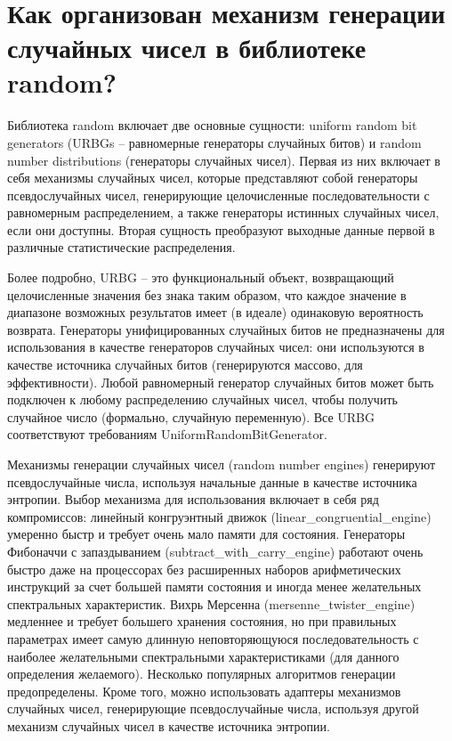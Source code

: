 \documentclass[a4paper,12pt]{article}	%
\title{
	\center{\textbf{Контрольные вопросы. Задание 16.}}
	}
\begin{document}

\maketitle

\section{Как организован механизм генерации случайных чисел в библиотеке random?}

	Библиотека random включает две основные сущности: uniform random bit generators (URBGs -- равномерные генераторы случайных битов) и random number distributions (генераторы случайных чисел). Первая из них включает в себя механизмы случайных чисел, которые представляют собой генераторы псевдослучайных чисел, генерирующие целочисленные последовательности с равномерным распределением, а также генераторы истинных случайных чисел, если они доступны. Вторая сущность преобразуют выходные данные первой в различные статистические распределения.
	
	Более подробно, URBG -- это функциональный объект, возвращающий целочисленные значения без знака таким образом, что каждое значение в диапазоне возможных результатов имеет (в идеале) одинаковую вероятность возврата. Генераторы унифицированных случайных битов не предназначены для использования в качестве генераторов случайных чисел: они используются в качестве источника случайных битов (генерируются массово, для эффективности). Любой равномерный генератор случайных битов может быть подключен к любому распределению случайных чисел, чтобы получить случайное число (формально, случайную переменную). Все URBG соответствуют требованиям UniformRandomBitGenerator.
	
	Механизмы генерации случайных чисел (random number engines) генерируют псевдослучайные числа, используя начальные данные в качестве источника энтропии. Выбор механизма для использования включает в себя ряд компромиссов: линейный конгруэнтный движок (linear\_congruential\_engine) умеренно быстр и требует очень мало памяти для состояния. Генераторы Фибоначчи с запаздыванием (subtract\_with\_carry\_engine) работают очень быстро даже на процессорах без расширенных наборов арифметических инструкций за счет большей памяти состояния и иногда менее желательных спектральных характеристик. Вихрь Мерсенна (mersenne\_twister\_engine) медленнее и требует большего хранения состояния, но при правильных параметрах имеет самую длинную неповторяющуюся последовательность с наиболее желательными спектральными характеристиками (для данного определения желаемого). Несколько популярных алгоритмов генерации предопределены. Кроме того, можно использовать адаптеры механизмов случайных чисел, генерирующие псевдослучайные числа, используя другой механизм случайных чисел в качестве источника энтропии.
	
\end{document}
